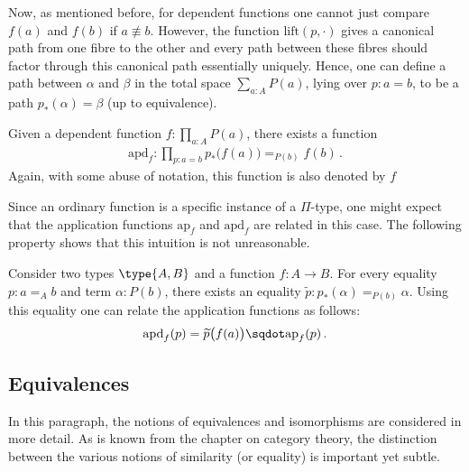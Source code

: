     Now, as mentioned before, for dependent functions one cannot just compare $f(a)$ and $f(b)$ if $a\not\equiv b$. However, the function $\mathrm{lift}(p,\cdot)$ gives a canonical path from one fibre to the other and every path between these fibres should factor through this canonical path essentially uniquely. Hence, one can define a path between $\alpha$ and $\beta$ in the total space $\sum_{a:A}P(a)$, lying over $p:a=b$, to be a path $p_*(\alpha)=\beta$ (up to equivalence).
    \begin{property}
        Given a dependent function $f:\prod_{a:A}P(a)$, there exists a function
        \begin{gather}
            \mathrm{apd}_f:\prod_{p:a=b}p_*\bigl(f(a)\bigr)=_{P(b)}f(b)\,.
        \end{gather}
        Again, with some abuse of notation, this function is also denoted by $f$
    \end{property}

    Since an ordinary function is a specific instance of a $\Pi$-type, one might expect that the application functions $\mathrm{ap}_f$ and $\mathrm{apd}_f$ are related in this case. The following property shows that this intuition is not unreasonable.
    \begin{property}
        Consider two types $\type{A,B}$ and a function $f:A\rightarrow B$. For every equality $p:a=_Ab$ and term $\alpha:P(b)$, there exists an equality $\widetilde{p}:p_*(\alpha)=_{P(b)}\alpha$. Using this equality one can relate the application functions as follows:
        \begin{gather}
            \mathrm{apd}_f(p) = \widetilde{p}\bigl(f(a)\bigr)\sqdot\mathrm{ap}_f(p)\,.
        \end{gather}
    \end{property}

\subsection{Equivalences}

    In this paragraph, the notions of equivalences and isomorphisms are considered in more detail. As is known from the chapter on category theory, the distinction between the various notions of similarity (or equality) is important yet subtle.

